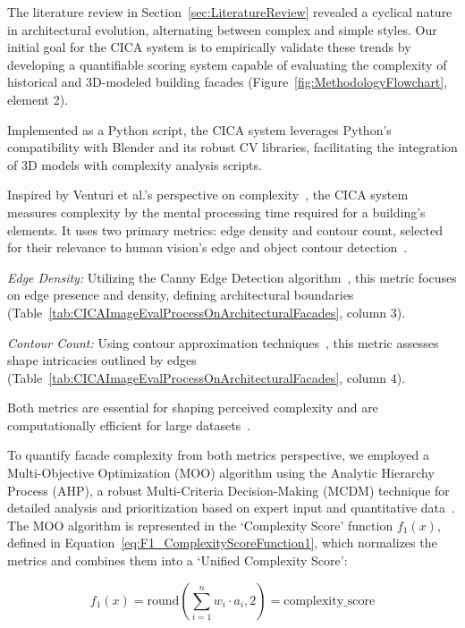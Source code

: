 
The literature review in Section~\ref{sec:LiteratureReview} revealed a cyclical nature in architectural evolution, alternating between complex and simple styles.
Our initial goal for the CICA system is to empirically validate these trends by developing a quantifiable scoring system capable of evaluating the complexity of historical and 3D-modeled building facades (Figure~\ref{fig:MethodologyFlowchart}, element 2).

Implemented as a Python script, the CICA system leverages Python's compatibility with Blender and its robust CV libraries, facilitating the integration of 3D models with complexity analysis scripts.

Inspired by Venturi et al.'s perspective on complexity~\cite{Venturi1977}, the CICA system measures complexity by the mental processing time required for a building's elements.
It uses two primary metrics: edge density and contour count, selected for their relevance to human vision's edge and object contour detection~\cite{Yang2022}.

\textit{Edge Density:} Utilizing the Canny Edge Detection algorithm~\cite{EdgeOpenCV2023}, this metric focuses on edge presence and density, defining architectural boundaries (Table~\ref{tab:CICAImageEvalProcessOnArchitecturalFacades}, column 3).

\textit{Contour Count:} Using contour approximation techniques~\cite{ContourOpenCV2023}, this metric assesses shape intricacies outlined by edges (Table~\ref{tab:CICAImageEvalProcessOnArchitecturalFacades}, column 4).

Both metrics are essential for shaping perceived complexity and are computationally efficient for large datasets~\cite{Yang2022}.

To quantify facade complexity from both metrics perspective, we employed a Multi-Objective Optimization (MOO) algorithm using the Analytic Hierarchy Process (AHP), a robust Multi-Criteria Decision-Making (MCDM) technique for detailed analysis and prioritization based on expert input and quantitative data~\cite{Taherdoost2023}.
The MOO algorithm is represented in the `Complexity Score' function \(f_1(x)\), defined in Equation~\ref{eq:F1_ComplexityScoreFunction1}, which normalizes the metrics and combines them into a `Unified Complexity Score':

\begin{equation}
    f_1(x) = \mathrm{round}\left(\sum_{i=1}^{n} w_i \cdot a_i, 2\right) = \text{complexity\_score}
    \label{eq:F1_ComplexityScoreFunction1}
\end{equation}

